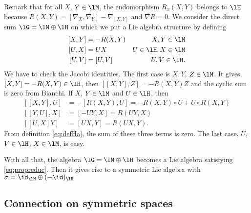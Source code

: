 Remark that for all $X$, $Y\in\lM$, the endomorphism $R_x(X,Y)$ belongs to $\lH$ because $R(X,Y)=[\nabla_X,\nabla_Y]-\nabla_{[X,Y]}$ and $\nabla R=0$. We consider the direct sum $\lG=\lM\oplus\lH$ on which we put a Lie algebra structure by defining
\begin{subequations}
\begin{align}
[X,Y]&=-R(X,Y)&X,Y\in\lM\\
[U,X]&=UX&U\in\lH,X\in\lM\\
[U,V]&=[U,V]&U,V\in\lH.
\end{align}
\end{subequations}
We have to check the Jacobi identities. The first case is $X,Y$, $Z\in\lM$. It gives $[X,Y]=-R(X,Y)\in\lH$, then $[[X,Y],Z]=-R(X,Y)Z$ and the cyclic sum is zero from Bianchi. If $X$, $Y\in\lM$ and $U\in\lH$, then
\begin{subequations}
\begin{align}
[[X,Y],U]&=-[R(X,Y),U]=-R(X,Y)\circ U+U\circ R(X,Y)\\
[[Y,U],X]&=[-UY,X]=R(UY,X)\\
[[U,X]Y]&=[UX,Y]=R(UX,Y).
\end{align}
\end{subequations}
From definition \eqref{eq:defHa}, the sum of these three terms is zero. The last case, $U$, $V\in\lH$, $X\in\lM$, is easy.

With all that, the algebra $\lG=\lM\oplus\lH$ becomes a Lie algebra satisfying \eqref{eq:propreduc}. Then it gives rise to a symmetric Lie algebra with $\sigma=\id_{\lM}\oplus(-\id)_{\lH}$


\subsection{Connection on symmetric spaces} 

